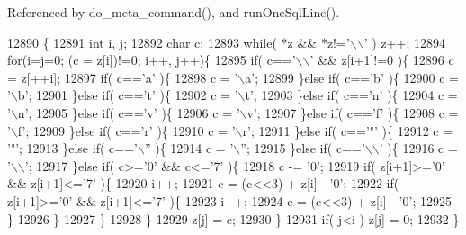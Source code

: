 Referenced by do\+\_\+meta\+\_\+command(), and run\+One\+Sql\+Line().


\begin{DoxyCode}
12890                                         \{
12891   \textcolor{keywordtype}{int} i, j;
12892   \textcolor{keywordtype}{char} c;
12893   \textcolor{keywordflow}{while}( *z && *z!=\textcolor{charliteral}{'\(\backslash\)\(\backslash\)'} ) z++;
12894   \textcolor{keywordflow}{for}(i=j=0; (c = z[i])!=0; i++, j++)\{
12895     \textcolor{keywordflow}{if}( c==\textcolor{charliteral}{'\(\backslash\)\(\backslash\)'} && z[i+1]!=0 )\{
12896       c = z[++i];
12897       \textcolor{keywordflow}{if}( c==\textcolor{charliteral}{'a'} )\{
12898         c = \textcolor{charliteral}{'\(\backslash\)a'};
12899       \}\textcolor{keywordflow}{else} \textcolor{keywordflow}{if}( c==\textcolor{charliteral}{'b'} )\{
12900         c = \textcolor{charliteral}{'\(\backslash\)b'};
12901       \}\textcolor{keywordflow}{else} \textcolor{keywordflow}{if}( c==\textcolor{charliteral}{'t'} )\{
12902         c = \textcolor{charliteral}{'\(\backslash\)t'};
12903       \}\textcolor{keywordflow}{else} \textcolor{keywordflow}{if}( c==\textcolor{charliteral}{'n'} )\{
12904         c = \textcolor{charliteral}{'\(\backslash\)n'};
12905       \}\textcolor{keywordflow}{else} \textcolor{keywordflow}{if}( c==\textcolor{charliteral}{'v'} )\{
12906         c = \textcolor{charliteral}{'\(\backslash\)v'};
12907       \}\textcolor{keywordflow}{else} \textcolor{keywordflow}{if}( c==\textcolor{charliteral}{'f'} )\{
12908         c = \textcolor{charliteral}{'\(\backslash\)f'};
12909       \}\textcolor{keywordflow}{else} \textcolor{keywordflow}{if}( c==\textcolor{charliteral}{'r'} )\{
12910         c = \textcolor{charliteral}{'\(\backslash\)r'};
12911       \}\textcolor{keywordflow}{else} \textcolor{keywordflow}{if}( c==\textcolor{charliteral}{'"'} )\{
12912         c = \textcolor{charliteral}{'"'};
12913       \}\textcolor{keywordflow}{else} \textcolor{keywordflow}{if}( c==\textcolor{charliteral}{'\(\backslash\)''} )\{
12914         c = \textcolor{charliteral}{'\(\backslash\)''};
12915       \}\textcolor{keywordflow}{else} \textcolor{keywordflow}{if}( c==\textcolor{charliteral}{'\(\backslash\)\(\backslash\)'} )\{
12916         c = \textcolor{charliteral}{'\(\backslash\)\(\backslash\)'};
12917       \}\textcolor{keywordflow}{else} \textcolor{keywordflow}{if}( c>=\textcolor{charliteral}{'0'} && c<=\textcolor{charliteral}{'7'} )\{
12918         c -= \textcolor{charliteral}{'0'};
12919         \textcolor{keywordflow}{if}( z[i+1]>=\textcolor{charliteral}{'0'} && z[i+1]<=\textcolor{charliteral}{'7'} )\{
12920           i++;
12921           c = (c<<3) + z[i] - \textcolor{charliteral}{'0'};
12922           \textcolor{keywordflow}{if}( z[i+1]>=\textcolor{charliteral}{'0'} && z[i+1]<=\textcolor{charliteral}{'7'} )\{
12923             i++;
12924             c = (c<<3) + z[i] - \textcolor{charliteral}{'0'};
12925           \}
12926         \}
12927       \}
12928     \}
12929     z[j] = c;
12930   \}
12931   \textcolor{keywordflow}{if}( j<i ) z[j] = 0;
12932 \}
\end{DoxyCode}
